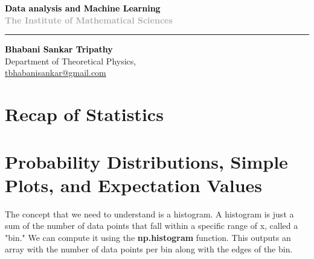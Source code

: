 \documentclass[a4paper,13pt]{report}
\makeatletter
\newcommand{\Title}{Data analysis and Machine Learning}
\newcommand{\Subtitle}{The Institute of Mathematical Sciences}
\newcommand{\Author}{Bhabani Sankar Tripathy}
\newcommand{\Department}{Department of Theoretical Physics}
\newcommand{\Email}{tbhabanisankar@gmail.com}
\makeatother
\begin{document}
	
	\begin{flushleft}
		\vspace*{6.0cm} %
		\textcolor{black}{\textbf{\LARGE \Title}}\\
		\vspace{0.5cm}
		\textcolor{darkgray}{\textbf{\Subtitle}}\\
		\vspace{0.5cm}
		\rule{\textwidth}{1.4pt} %
	\end{flushleft}
	
	\vspace{0.5cm} %
	\begin{flushleft}
		\textcolor{black}{\large{\textbf{\Author}}}\\
		\textcolor{auburn}{\Department,}\\
		\vspace{0.5cm}
		\textcolor{auburn}{\href{mailto:\Email}{\Email}}
	\end{flushleft}
	\newpage

\tableofcontents
\chapter{Recap of Statistics}
\chapter{Probability Distributions, Simple Plots, and Expectation Values} 
The concept that we need to understand is a histogram. A histogram is just a sum of the number of data points that fall within a specific range of x, called a "bin." We can compute it using the \textbf{np.histogram} function. This outputs an array with the number of data points per bin along with the edges of the bin. \\
\end{document}
